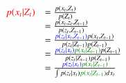 {%
\begin{equation}
\begin{array}{lllllllll}
{\color{red}p(x_t | Z_t)} &= \frac{p(x_t, Z_t)}{p(Z_t)}\\
&= \frac{p(x_t, z_t, Z_{t-1})}{p(z_t, Z_{t-1})}\\
&= \frac{{\color{blue}p(z_t|x_t,Z_{t-1})}p(x_t, Z_{t-1})}{p(z_t|Z_{t-1})p(Z_{t-1})}\\
&= \frac{{\color{blue}p(z_t|x_t)}{\color{darkgreen}p(x_t|Z_{t-1})}p(Z_{t-1})}{p(z_t|Z_{t-1})p(Z_{t-1})}\\
&= \frac{{\color{blue}p(z_t|x_t)}{\color{darkgreen}p(x_t|Z_{t-1})}}{\int{p(z_t|x_t){\color{darkgreen}p(x_t |Z_{t-1})}}dx_t}
\end{array}
\label{Eqn:TRK_update}
\end{equation}
}




